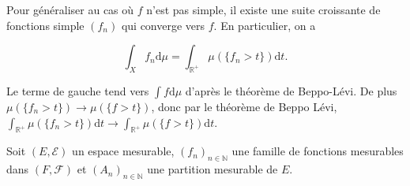 \documentclass[11pt, answers]{exam}
\newcommand{\N}{\mathbb N}            %
\begin{document}
\begin{questions}
\begin{solution}
Pour généraliser au cas où $f$ n'est pas simple, il existe une suite croissante de fonctions simple $(f_n)$ qui converge vers $f$. En particulier, on a

\[ \int_X f_n \mathrm{d}\mu = \int_{\mathbb{R}^+} \mu(\{f_n>t\}) \mathrm{d}t. \]

Le terme de gauche tend vers $\int f \mathrm{d}\mu$ d'après le théorème de Beppo-Lévi. De plus $\mu(\{f_n>t\}) \to \mu(\{f>t\})$, donc par le théorème de Beppo Lévi, $\int_{\mathbb{R}^+} \mu(\{f_n>t\}) \mathrm{d}t \to \int_{\mathbb{R}^+} \mu(\{f>t\}) \mathrm{d}t$.


\end{solution}

\question Soit $(E,\mathcal{E})$ un espace mesurable, $(f_n)_{n\in \N}$ une famille de fonctions mesurables dans $(F,\mathcal{F})$ et $(A_n)_{n\in \N}$ une partition mesurable de $E$.

\begin{solution}
\end{solution}
\end{questions}

%
\end{document}
